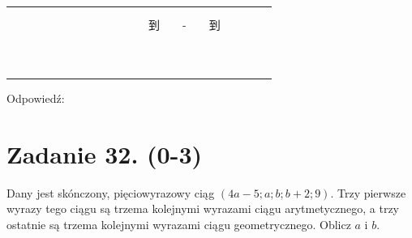 \documentclass[10pt]{article}
\begin{document}
\begin{center}
\begin{tabular}{|c|c|c|c|c|c|c|c|c|c|c|c|c|c|c|c|c|c|c|c|c|}
\hline
 &  &  &  &  &  &  &  &  &  &  &  &  &  &  &  &  &  &  &  &  \\
\hline
 &  &  &  &  &  &  &  &  &  &  &  &  &  &  &  &  &  &  &  &  \\
\hline
 &  &  &  &  &  &  &  &  &  &  &  &  &  &  &  &  &  &  &  &  \\
\hline
 &  &  &  &  &  &  &  &  &  &  &  & 到 &  & - &  & 到 &  &  &  &  \\
\hline
 &  &  &  &  &  &  &  &  &  &  &  &  &  &  &  &  &  &  &  &  \\
\hline
 &  &  &  &  &  &  &  &  &  &  &  &  &  &  &  &  &  &  &  &  \\
\hline
 &  &  &  &  &  &  &  &  &  &  &  &  &  &  &  &  &  &  &  &  \\
\hline
 &  &  &  &  &  &  &  &  &  &  &  &  &  &  &  &  &  &  &  &  \\
\hline
 &  &  &  &  &  &  &  &  &  &  &  &  &  &  &  &  &  &  &  &  \\
\hline
 &  &  &  &  &  &  &  &  &  &  &  &  &  &  &  &  &  &  &  &  \\
\hline
 &  &  &  &  &  &  &  &  &  &  &  &  &  &  &  &  &  &  &  &  \\
\hline
 &  &  &  &  &  &  &  &  &  &  &  &  &  &  &  &  &  &  &  &  \\
\hline
 &  &  &  &  &  &  &  &  &  &  &  &  &  &  &  &  &  &  &  &  \\
\hline
 &  &  &  &  &  &  &  &  &  &  &  &  &  &  &  &  &  &  &  &  \\
\hline
\end{tabular}
\end{center}

Odpowiedź: \(\qquad\)

\section*{Zadanie 32. (0-3)}
Dany jest skónczony, pięciowyrazowy ciąg \((4 a-5 ; a ; b ; b+2 ; 9)\). Trzy pierwsze wyrazy tego ciągu są trzema kolejnymi wyrazami ciągu arytmetycznego, a trzy ostatnie są trzema kolejnymi wyrazami ciągu geometrycznego. Oblicz \(a\) i \(b\).
\end{document}
